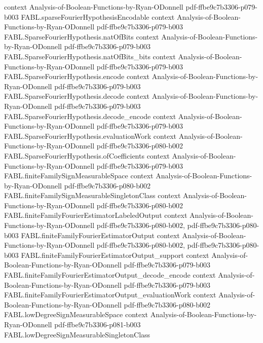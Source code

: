 \begin{theorem}
  {context}
  {Analysis-of-Boolean-Functions-by-Ryan-ODonnell}
  {pdf-ffbe9c7b3306-p079-b003}
\proofstep
  {FABL.sparseFourierHypothesisEncodable}
  {context}
  {Analysis-of-Boolean-Functions-by-Ryan-ODonnell}
  {pdf-ffbe9c7b3306-p079-b003}
\proofstep
  {FABL.SparseFourierHypothesis.natOfBits}
  {context}
  {Analysis-of-Boolean-Functions-by-Ryan-ODonnell}
  {pdf-ffbe9c7b3306-p079-b003}
\proofstep
  {FABL.SparseFourierHypothesis.natOfBits_bits}
  {context}
  {Analysis-of-Boolean-Functions-by-Ryan-ODonnell}
  {pdf-ffbe9c7b3306-p079-b003}
\proofstep
  {FABL.SparseFourierHypothesis.encode}
  {context}
  {Analysis-of-Boolean-Functions-by-Ryan-ODonnell}
  {pdf-ffbe9c7b3306-p079-b003}
\proofstep
  {FABL.SparseFourierHypothesis.decode}
  {context}
  {Analysis-of-Boolean-Functions-by-Ryan-ODonnell}
  {pdf-ffbe9c7b3306-p079-b003}
\proofstep
  {FABL.SparseFourierHypothesis.decode_encode}
  {context}
  {Analysis-of-Boolean-Functions-by-Ryan-ODonnell}
  {pdf-ffbe9c7b3306-p079-b003}
\proofstep
  {FABL.SparseFourierHypothesis.evaluationWork}
  {context}
  {Analysis-of-Boolean-Functions-by-Ryan-ODonnell}
  {pdf-ffbe9c7b3306-p080-b002}
\proofstep
  {FABL.SparseFourierHypothesis.ofCoefficients}
  {context}
  {Analysis-of-Boolean-Functions-by-Ryan-ODonnell}
  {pdf-ffbe9c7b3306-p079-b003}
\proofstep
  {FABL.finiteFamilySignMeasurableSpace}
  {context}
  {Analysis-of-Boolean-Functions-by-Ryan-ODonnell}
  {pdf-ffbe9c7b3306-p080-b002}
\proofstep
  {FABL.finiteFamilySignMeasurableSingletonClass}
  {context}
  {Analysis-of-Boolean-Functions-by-Ryan-ODonnell}
  {pdf-ffbe9c7b3306-p080-b002}
\proofstep
  {FABL.finiteFamilyFourierEstimatorLabeledOutput}
  {context}
  {Analysis-of-Boolean-Functions-by-Ryan-ODonnell}
  {pdf-ffbe9c7b3306-p080-b002,
    pdf-ffbe9c7b3306-p080-b003}
\proofstep
  {FABL.finiteFamilyFourierEstimatorOutput}
  {context}
  {Analysis-of-Boolean-Functions-by-Ryan-ODonnell}
  {pdf-ffbe9c7b3306-p080-b002,
    pdf-ffbe9c7b3306-p080-b003}
\proofstep
  {FABL.finiteFamilyFourierEstimatorOutput_support}
  {context}
  {Analysis-of-Boolean-Functions-by-Ryan-ODonnell}
  {pdf-ffbe9c7b3306-p079-b003}
\proofstep
  {FABL.finiteFamilyFourierEstimatorOutput_decode_encode}
  {context}
  {Analysis-of-Boolean-Functions-by-Ryan-ODonnell}
  {pdf-ffbe9c7b3306-p079-b003}
\proofstep
  {FABL.finiteFamilyFourierEstimatorOutput_evaluationWork}
  {context}
  {Analysis-of-Boolean-Functions-by-Ryan-ODonnell}
  {pdf-ffbe9c7b3306-p080-b002}
\proofstep
  {FABL.lowDegreeSignMeasurableSpace}
  {context}
  {Analysis-of-Boolean-Functions-by-Ryan-ODonnell}
  {pdf-ffbe9c7b3306-p081-b003}
\proofstep
  {FABL.lowDegreeSignMeasurableSingletonClass}

\end{theorem}
